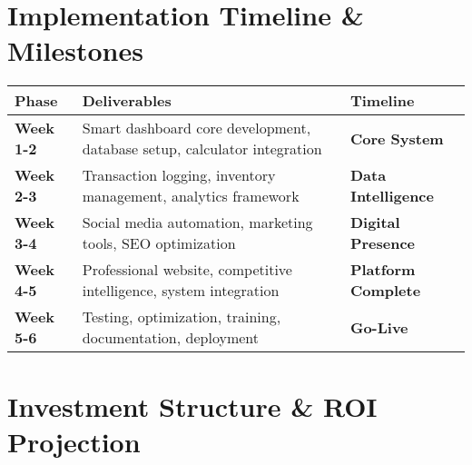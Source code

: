 \documentclass[11pt, letterpaper]{article}
\begin{document}
\section{Implementation Timeline \& Milestones}

\begin{center}
\begin{tabularx}{\textwidth}{|l|X|l|}
\hline
\textbf{Phase} & \textbf{Deliverables} & \textbf{Timeline} \\
\hline
\textbf{Week 1-2} & Smart dashboard core development, database setup, calculator integration & \textbf{Core System} \\
\hline
\textbf{Week 2-3} & Transaction logging, inventory management, analytics framework & \textbf{Data Intelligence} \\
\hline
\textbf{Week 3-4} & Social media automation, marketing tools, SEO optimization & \textbf{Digital Presence} \\
\hline
\textbf{Week 4-5} & Professional website, competitive intelligence, system integration & \textbf{Platform Complete} \\
\hline
\textbf{Week 5-6} & Testing, optimization, training, documentation, deployment & \textbf{Go-Live} \\
\hline
\end{tabularx}
\end{center}

\section{Investment Structure \& ROI Projection}
\end{document}
